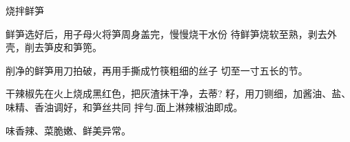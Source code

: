 \begin{recipe}{烧拌鲜笋}

\ingredients


\cooking

\step 鲜笋选好后，用子母火将笋周身盖完，慢慢烧干水份 待鲜笋烧软至熟，剥去外壳，削去笋皮和笋篼。

削净的鲜笋用刀拍破，再用手撕成竹筷粗细的丝子 切至一寸五长的节。

\step 干辣椒先在火上烧成黑红色，把灰渣抹干净，去蒂? 籽，用刀铡细，加酱油、盐、味精、香油调好，和笋丝共同 拌勻.面上淋辣椒油即成。

\notes

味香辣、菜脆嫩、鲜美异常。

\end{recipe}

